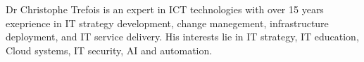 

\begin{cvparagraph}

Dr Christophe Trefois is an expert in ICT technologies with over 15 years exeprience in IT strategy development, change manegement, infrastructure deployment, and IT service delivery. His interests lie in IT strategy, IT education, Cloud systems, IT security, AI and automation. 
\end{cvparagraph}
